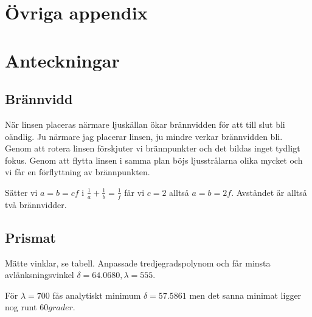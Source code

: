 \documentclass[a4paper]{article}
\begin{document}
\section{Övriga appendix}

\section{Anteckningar}

\subsection{Brännvidd}
När linsen placeras närmare ljuskällan ökar brännvidden för att till slut bli oändlig. Ju närmare jag placerar linsen,
ju mindre verkar brännvidden bli. Genom att rotera linsen förskjuter vi brännpunkter och
det bildas inget tydligt fokus. Genom att flytta linsen i samma plan böjs ljusstrålarna
olika mycket och vi får en förflyttning av brännpunkten.

Sätter vi $a = b = cf$ i $ \frac{1}{a} + \frac{1}{b} = \frac{1}{f}$ får vi $c=2$ alltså $a=b=2f$. Avståndet är alltså två brännvidder.


\subsection{Prismat}
Mätte vinklar, se tabell. Anpassade tredjegradspolynom och får minsta avlänksningsvinkel $\delta = 64.0680, \lambda=555$.

För $\lambda = 700$ fås analytiskt minimum $\delta = 57.5861$ men det sanna minimat ligger nog runt $60 grader$.
\end{document}
